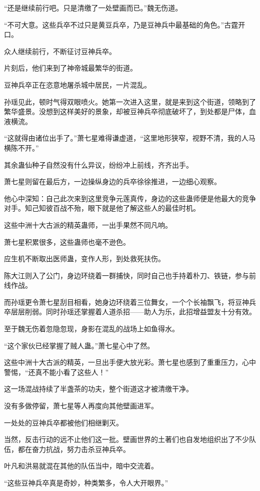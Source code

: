 \begin{this_body}
“还是继续前行吧。只是清缴了一处壁画而已。”魏无伤道。

“不可大意。这些兵卒不过只是黄豆兵卒，乃是豆神兵中最基础的角色。”古霆开口。

众人继续前行，不断征讨豆神兵卒。

片刻后，他们来到了神帝城最繁华的街道。

豆神兵卒正在恣意地屠杀城中居民，一片混乱。

孙瑶见此，顿时气得双眼喷火。她第一次进入这里，就是来到这个街道，领略到了繁华盛景。没想到这样美好的景象，却被豆神兵卒彻底破坏了，到处都是尸体，血液横流。

“这就得由诸位出手了。”萧七星难得谦虚道，“这里地形狭窄，视野不清，我的人马横陈不开。”

其余蛊仙种子自然没有什么异议，纷纷冲上前线，齐齐出手。

萧七星则留在最后方，一边操纵身边的兵卒徐徐推进，一边细心观察。

他心中深知：自己此次来到这里竞争元莲真传，身边的这些蛊师便是他最大的竞争对手。知己知彼百战不殆，眼下就是他了解这些人的最佳时机。

这些中洲十大古派的精英蛊师，一出手果然不同凡响。

萧七星积累很多，这些蛊师也毫不逊色。

应生机不断取出医师蛊，变作人形，到处救死扶伤。

陈大江则入了公门，身边环绕着一群捕快，同时自己也手持着朴刀、铁链，参与前线作战。

而孙瑶更令萧七星刮目相看，她身边环绕着三位舞女，一个个长袖飘飞，将豆神兵卒层层削弱。同时孙瑶还掌握着人道杀招——助人为乐，此招增益盟友十分有效。

至于魏无伤着忽隐忽现，身影在混乱的战场上如鱼得水。

“这个家伙已经掌握了贼人蛊。”萧七星心中了然。

这些中洲十大古派的精英，一旦出手便大放光彩。萧七星也感到了重重压力，心中警惕，“还真不能小看了这些人！”

这一场混战持续了半盏茶的功夫，整个街道这才被清缴干净。

没有多做停留，萧七星等人再度向其他壁画进军。

一处处的豆神兵卒都被他们相继剿灭。

当然，反击行动的远不止他们这一批。壁画世界的土著们也自发地组织出了不少队伍，都在奋力抗战，努力击杀豆神兵卒。

叶凡和洪易就混在其他的队伍当中，暗中交流着。

“这些豆神兵卒真是奇妙，种类繁多，令人大开眼界。”


\end{this_body}
